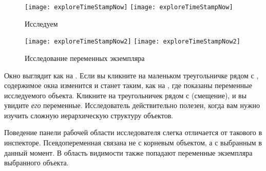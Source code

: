 \documentclass[a4paper,10pt,twoside]{book}
\begin{document}
\begin{figure}[tbp]
\begin{minipage}{0.48\textwidth}
	\begin{center}
	\ifluluelse
		{\texttt{[image: exploreTimeStampNow]}}
		{\texttt{[image: exploreTimeStampNow]}}
	\end{center}
	\caption{Исследуем \ct{TimeStamp now}}
\end{minipage}
\hfill
\begin{minipage}{0.48\textwidth}
	\begin{center}
	\ifluluelse
		{\texttt{[image: exploreTimeStampNow2]}}
		{\texttt{[image: exploreTimeStampNow2]}}
	\end{center}
	\caption{Исследование переменных экземпляра}
\end{minipage}
\end{figure}

Окно  выглядит как на .
Если вы кликните на маленьком треугольничке рядом с , содержимое окна изменится и станет таким, как на , где показаны переменные исследуемого объекта.
Кликните на треугольничек рядом с  (смещение), и вы увидите \emph{его} переменные.
Исследователь действительно полезен, когда вам нужно изучить сложную иерархическую структуру объектов.

Поведение панели рабочей области исследователя слегка отличается от такового в инспекторе.
Псевдопеременная  связана не с корневым объектом, а с выбранным в данный момент. В область видимости также попадают переменные экземпляра выбранного объекта.
\end{document}
